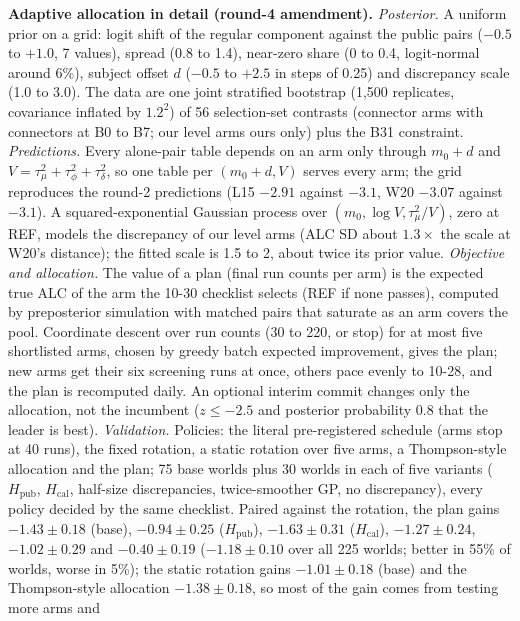 \documentclass[
]{article}
\begin{document}
\textbf{Adaptive allocation in detail (round-4 amendment).}
\emph{Posterior.} A uniform prior on a grid: logit shift of the regular
component against the public pairs (\(-0.5\) to \(+1.0\), 7 values),
spread (0.8 to 1.4), near-zero share (0 to 0.4, logit-normal around
6\%), subject offset \(d\) (\(-0.5\) to \(+2.5\) in steps of 0.25) and
discrepancy scale (1.0 to 3.0). The data are one joint stratified
bootstrap (1,500 replicates, covariance inflated by \(1.2^2\)) of 56
selection-set contrasts (connector arms with connectors at B0 to B7; our
level arms ours only) plus the B31 constraint. \emph{Predictions.} Every
alone-pair table depends on an arm only through \(m_0 + d\) and
\(V = \tau_\mu^2 + \tau_\phi^2 + \tau_\delta^2\), so one table per
\((m_0 + d, V)\) serves every arm; the grid reproduces the round-2
predictions (L15 \(-2.91\) against \(-3.1\), W20 \(-3.07\) against
\(-3.1\)). A squared-exponential Gaussian process over
\((m_0, \log V, \tau_\mu^2/V)\), zero at REF, models the discrepancy of
our level arms (ALC SD about \(1.3 \times\) the scale at W20's
distance); the fitted scale is 1.5 to 2, about twice its prior value.
\emph{Objective and allocation.} The value of a plan (final run counts
per arm) is the expected true ALC of the arm the 10-30 checklist selects
(REF if none passes), computed by preposterior simulation with matched
pairs that saturate as an arm covers the pool. Coordinate descent over
run counts (30 to 220, or stop) for at most five shortlisted arms,
chosen by greedy batch expected improvement, gives the plan; new arms
get their six screening runs at once, others pace evenly to 10-28, and
the plan is recomputed daily. An optional interim commit changes only
the allocation, not the incumbent (\(z \le -2.5\) and posterior
probability 0.8 that the leader is best). \emph{Validation.} Policies:
the literal pre-registered schedule (arms stop at 40 runs), the fixed
rotation, a static rotation over five arms, a Thompson-style allocation
and the plan; 75 base worlds plus 30 worlds in each of five variants
(\(H_{\mathrm{pub}}\), \(H_{\mathrm{cal}}\), half-size discrepancies,
twice-smoother GP, no discrepancy), every policy decided by the same
checklist. Paired against the rotation, the plan gains
\(-1.43 \pm 0.18\) (base), \(-0.94 \pm 0.25\) (\(H_{\mathrm{pub}}\)),
\(-1.63 \pm 0.31\) (\(H_{\mathrm{cal}}\)), \(-1.27 \pm 0.24\),
\(-1.02 \pm 0.29\) and \(-0.40 \pm 0.19\) (\(-1.18 \pm 0.10\) over all
225 worlds; better in 55\% of worlds, worse in 5\%); the static rotation
gains \(-1.01 \pm 0.18\) (base) and the Thompson-style allocation
\(-1.38 \pm 0.18\), so most of the gain comes from testing more arms and
\end{document}
